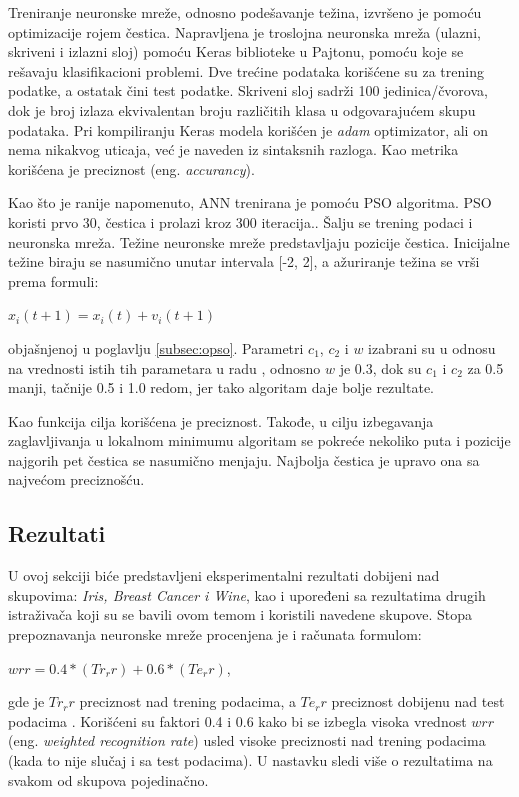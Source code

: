 \documentclass[a4paper]{article}
\begin{document}
Treniranje neuronske mreže, odnosno podešavanje težina, izvršeno je pomoću optimizacije rojem čestica. 
Napravljena je troslojna neuronska mreža (ulazni, skriveni i izlazni sloj) pomoću Keras biblioteke u Pajtonu, pomoću koje se rešavaju klasifikacioni problemi. 
Dve trećine podataka korišćene su za trening podatke, a ostatak čini test podatke. Skriveni sloj sadrži 100 jedinica/čvorova, dok je broj izlaza 
ekvivalentan broju različitih klasa u odgovarajućem skupu podataka. Pri kompiliranju Keras modela korišćen je \textit{adam} optimizator,
ali on nema nikakvog uticaja, već je naveden iz sintaksnih razloga. Kao metrika korišćena je preciznost (eng. \emph{accurancy}). 

Kao što je ranije napomenuto, ANN trenirana je pomoću PSO algoritma. PSO koristi prvo 30, čestica i prolazi kroz 300 iteracija.. 
Šalju se trening podaci i neuronska mreža. Težine neuronske mreže predstavljaju pozicije čestica. Inicijalne težine biraju se 
nasumično unutar intervala [-2, 2], a ažuriranje težina se vrši prema formuli: 

\begin{center}
{$x_i(t+1) = x_i(t) + v_i(t+1)$}
\end{center}
objašnjenoj u poglavlju \ref{subsec:opso}. Parametri $c_1$, $c_2$ i $w$ izabrani su u odnosu na vrednosti istih tih parametara u radu \cite{hindawi},
odnosno $w$ je 0.3, dok su $c_1$ i $c_2$ za 0.5 manji, tačnije 0.5 i 1.0 redom, jer tako algoritam daje bolje rezultate. 

Kao funkcija cilja korišćena je preciznost. Takođe, u cilju izbegavanja zaglavljivanja u lokalnom minimumu algoritam se pokreće 
nekoliko puta i pozicije najgorih pet čestica se nasumično menjaju. Najbolja čestica je upravo ona sa najvećom preciznošću.

\subsection{Rezultati}
\label{rezultati}

U ovoj sekciji biće predstavljeni eksperimentalni rezultati dobijeni nad skupovima: \textit{Iris, Breast Cancer i Wine}, kao i upoređeni sa
rezultatima drugih istraživača koji su se bavili ovom temom i koristili navedene skupove. Stopa prepoznavanja neuronske
mreže procenjena je i računata formulom:

\begin{center}
{$wrr = 0.4*(Tr_r r) + 0.6*(Te_r r)$}, 
\end{center}
gde je $Tr_r r$ preciznost nad trening podacima, a $Te_r r$ preciznost dobijenu nad test podacima \cite{hindawi}. 
Korišćeni su faktori 0.4 i 0.6 kako bi se izbegla visoka vrednost $wrr$ (eng. \emph{weighted recognition rate}) 
usled visoke preciznosti nad trening podacima  (kada to nije slučaj i sa test podacima). U nastavku sledi više o rezultatima 
na svakom od skupova pojedinačno.
\end{document}
